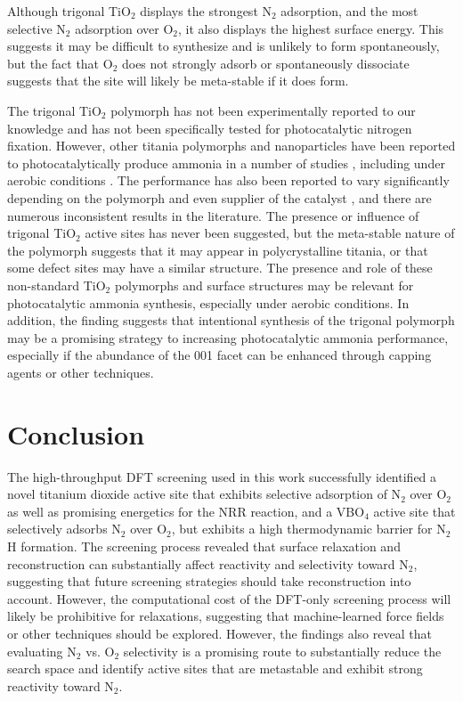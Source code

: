 Although trigonal TiO$_2$ displays the strongest N$_2$ adsorption, and the most selective N$_2$ adsorption over O$_2$, it also displays the highest surface energy. This suggests it may be difficult to synthesize and is unlikely to form spontaneously, but the fact that O$_2$ does not strongly adsorb or spontaneously dissociate suggests that the site will likely be meta-stable if it does form.

The trigonal TiO$_2$ polymorph has not been experimentally reported to our knowledge and has not been specifically tested for photocatalytic nitrogen fixation. 
However, other titania polymorphs and nanoparticles have been reported to photocatalytically produce ammonia in a number of studies \cite{Comer_sustainable, Comer2019ProspectsFertilizers, Hirakawa_2017, Lu1994, Benkoula2015, Rusu2001, Henderson_2011, Cheng2011}, including under aerobic conditions \cite{Liu_2022}. The performance has also been reported to vary significantly depending on the polymorph and even supplier of the catalyst \cite{Hirakawa_2017}, and there are numerous inconsistent results in the literature. The presence or influence of trigonal TiO$_2$ active sites has never been suggested, but the meta-stable nature of the polymorph suggests that it may appear in polycrystalline titania, or that some defect sites may have a similar structure. The presence and role of these non-standard TiO$_2$ polymorphs and surface structures may be relevant for photocatalytic ammonia synthesis, especially under aerobic conditions. In addition, the finding suggests that intentional synthesis of the trigonal polymorph may be a promising strategy to increasing photocatalytic ammonia performance, especially if the abundance of the 001 facet \cite{Roy2013SynergyPhotocatalysis, Kislov2022EffectCompound, YongChae2003PreparationFilms, Liao2013ActivatingFacets, Yu2012Low-costPhotoactivities} can be enhanced through capping agents or other techniques.



\section*{Conclusion}
The high-throughput DFT screening used in this work successfully identified a novel titanium dioxide active site that exhibits selective adsorption of N$_2$ over O$_2$ as well as promising energetics for the NRR reaction, and a VBO$_4$ active site that selectively adsorbs N$_2$ over O$_2$, but exhibits a high thermodynamic barrier for N$_2$H formation. The screening process revealed that surface relaxation and reconstruction can substantially affect reactivity and selectivity toward N$_2$, suggesting that future screening strategies should take reconstruction into account. However, the computational cost of the DFT-only screening process will likely be prohibitive for relaxations, suggesting that machine-learned force fields or other techniques should be explored. However, the findings also reveal that evaluating N$_2$ vs. O$_2$ selectivity is a promising route to substantially reduce the search space and identify active sites that are metastable and exhibit strong reactivity toward N$_2$.

